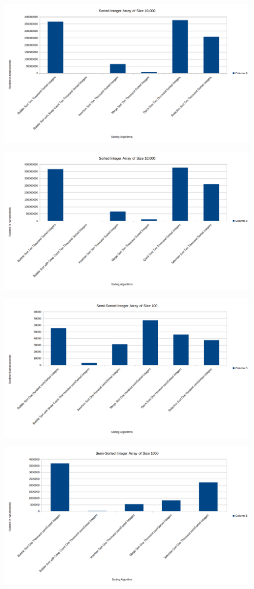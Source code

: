 \documentclass[]{article}
\begin{document}
\centerline{\includegraphics[scale=.5]{Sorted10000}}
\centerline{\includegraphics[scale=.5]{Sorted10000}}
\centerline{\includegraphics[scale=.5]{semiSorted100}}
\centerline{\includegraphics[scale=.5]{semiSorted1000}}
\end{document}
